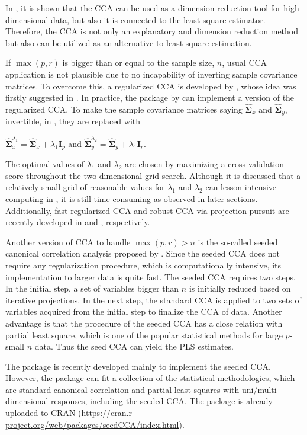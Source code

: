 In \cite{ccalm}, it is shown that
the CCA can be used as a dimension reduction tool
for high-dimensional data, but also it is connected to the least square estimator.
Therefore, the CCA  is not only an explanatory and dimension reduction method
but also can be utilized as an alternative to least square estimation.

If $\max(p,r)$ is bigger than or equal to the sample size, $n$,
usual CCA application is not plausible
due to no incapability of inverting sample covariance matrices.
To overcome this, a regularized CCA is developed by \cite{ccadc},
whose idea was firstly suggested in \cite{ccajp}.
In practice, the  package by \cite{ecca}
can implement a version of the regularized CCA.
To make the sample covariance matrices saying
${\hat{\boldsymbol{\Sigma}}}_{x}$ and ${\hat{\boldsymbol{\Sigma}}}_{y}$, invertible,
in \cite{ecca}, they are replaced with

\centerline{
${\hat{\boldsymbol{\Sigma}}}_{x}^{\lambda_1}=
{\hat{\boldsymbol{\Sigma}}}_{x}+\lambda_1 \mathbf{I}_p$
and ${\hat{\boldsymbol{\Sigma}}}_{y}^{\lambda_2}=
{\hat{\boldsymbol{\Sigma}}}_{y}+\lambda_1 \mathbf{I}_r$.}

The optimal values of $\lambda_1$ and $\lambda_2$ are chosen
by maximizing a cross-validation score throughout the two-dimensional grid search.
Although it is discussed that a relatively small grid
of reasonable values for $\lambda_1$ and $\lambda_2$ can lesson
intensive computing in \cite{ecca},
it is still time-consuming as observed in later sections.
Additionally, fast regularized CCA and robust CCA via projection-pursuit
are recently developed in \cite{FRCC} and \cite{ccaPP}, respectively.

Another version of CCA to handle $\max(p,r)>n$ is
the so-called seeded canonical correlation analysis
proposed by \cite{scca}. 
Since the seeded CCA does not require
any regularization procedure, which is computationally intensive,
its implementation to larger data is quite fast.
The seeded CCA requires two steps.
In the initial step, a set of variables bigger than $n$
is initially reduced based on iterative projections.
In the next step, the standard CCA is applied to
two sets of variables acquired from the initial step
to finalize the CCA of data.
Another advantage is that the procedure of the seeded CCA
has a close relation with partial least square,
which is one of the popular statistical methods for large $p$-small $n$ data. 
Thus the seed CCA can yield the PLS estimates.

The  package is recently developed
mainly to implement the seeded CCA.
However, the package can fit a collection of the statistical methodologies,
which are standard canonical correlation and partial least squares
with uni/multi-dimensional responses, including the seeded CCA.
The package is already uploaded to CRAN
(\url{https://cran.r-project.org/web/packages/seedCCA/index.html}).

